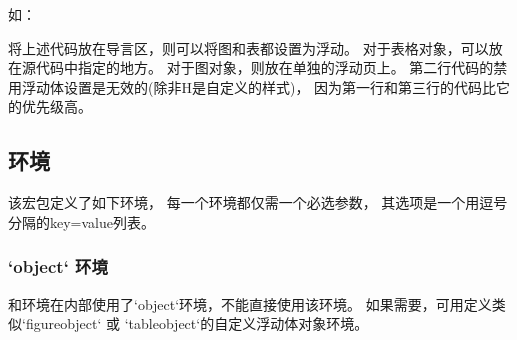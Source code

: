如：

\begin{examplecode}
\end{examplecode}

将上述代码放在导言区，则可以将图和表都设置为浮动。
对于表格对象，可以放在源代码中指定的地方。
对于图对象，则放在单独的浮动页上。
第二行代码的禁用浮动体设置是无效的(除非H是自定义的样式)，
因为第一行和第三行的代码比它的优先级高。

\subsection{环境}
\label{environments}

该宏包定义了如下环境，
每一个环境都仅需一个必选参数，
其选项是一个用逗号分隔的key=value列表。

\subsubsection{`object` 环境}
\label{object-environment}
\begingroup
{}
 和环境在内部使用了`object`环境，不能直接使用该环境。
如果需要，可用\cmd{\NewObjectStyle}定义类似`figureobject` 或 `tableobject`的自定义浮动体对象环境。

